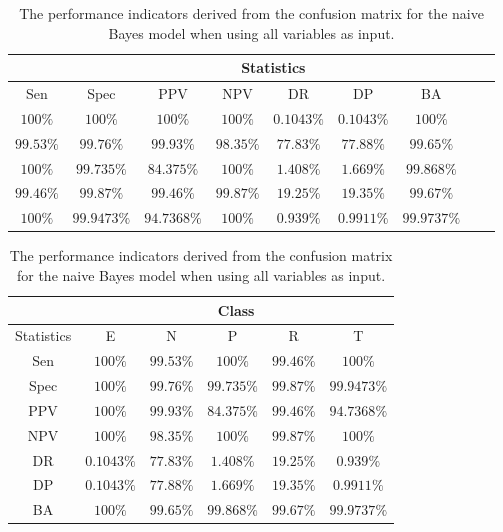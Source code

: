 \begin{table}[!ht]
	\centering
	\begin{tabular}{|c|c|c|c|c|c|c|c|c|}
		\hline
		 & \multicolumn{7}{c|}{Statistics} \\ \hline
		Sen & Spec & PPV & NPV & DR & DP & BA \\ \hline
		$100\%$ & $100\%$ & $100\%$ & $100\%$ & $0.1043\%$ & $0.1043\%$ & $100\%$ \\ \hline
		$99.53\%$ & $99.76\%$ & $99.93\%$ & $98.35\%$ & $77.83\%$ & $77.88\%$ & $99.65\%$ \\ \hline
		$100\%$ & $99.735\%$ & $84.375\%$ & $100\%$ & $1.408\%$ & $1.669\%$ & $99.868\%$ \\ \hline
		$99.46\%$ & $99.87\%$ & $99.46\%$ & $99.87\%$ & $19.25\%$ & $19.35\%$ & $99.67\%$ \\ \hline
		$100\%$ & $99.9473\%$ & $94.7368\%$ & $100\%$ & $0.939\%$ & $0.9911\%$ & $99.9737\%$ \\ \hline
	\end{tabular}
	\caption{The performance indicators derived from the confusion matrix for the naive Bayes model when using all variables as input.}
	\label{tab:cs:all:nb}
\end{table}

\begin{table}[!ht]
	\centering
	\begin{tabular}{|c|c|c|c|c|c|}
		\hline
		 & \multicolumn{5}{c|}{Class} \\ \hline
		Statistics & E & N & P & R & T \\ \hline
		Sen & $100\%$ & $99.53\%$ & $100\%$ & $99.46\%$ & $100\%$ \\ \hline
		Spec & $100\%$ & $99.76\%$ & $99.735\%$ & $99.87\%$ & $99.9473\%$ \\ \hline
		PPV & $100\%$ & $99.93\%$ & $84.375\%$ & $99.46\%$ & $94.7368\%$ \\ \hline
		NPV & $100\%$ & $98.35\%$ & $100\%$ & $99.87\%$ & $100\%$ \\ \hline
		DR & $0.1043\%$ & $77.83\%$ & $1.408\%$ & $19.25\%$ & $0.939\%$ \\ \hline
		DP & $0.1043\%$ & $77.88\%$ & $1.669\%$ & $19.35\%$ & $0.9911\%$ \\ \hline
		BA & $100\%$ & $99.65\%$ & $99.868\%$ & $99.67\%$ & $99.9737\%$ \\ \hline
	\end{tabular}
	\caption{The performance indicators derived from the confusion matrix for the naive Bayes model when using all variables as input.}
	\label{tab:cs:reverse:all:nb}
\end{table}

